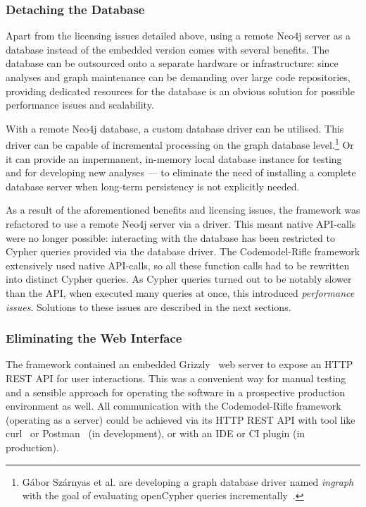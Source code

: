 \subsubsection{Detaching the Database}

Apart from the licensing issues detailed above, using a remote Neo4j server as a database instead of the embedded version comes with several benefits. The database can be outsourced onto a separate hardware or infrastructure: since analyses and graph maintenance can be demanding over large code repositories, providing dedicated resources for the database is an obvious solution for possible performance issues and scalability.

With a remote Neo4j database, a custom database driver can be utilised. This driver can be capable of incremental processing on the graph database level.\footnote{Gábor Szárnyas et al. are developing a graph database driver named \emph{ingraph} with the goal of evaluating openCypher queries incrementally~\cite{ingraph-github}.} Or it can provide an impermanent, in-memory local database instance for testing and for developing new analyses — to eliminate the need of installing a complete database server when long-term persistency is not explicitly needed.

As a result of the aforementioned benefits and licensing issues, the framework was refactored to use a remote Neo4j server via a driver. This meant native API-calls were no longer possible: interacting with the database has been restricted to Cypher queries provided via the database driver. The Codemodel-Rifle framework extensively used native API-calls, so all these function calls had to be rewritten into distinct Cypher queries. As Cypher queries turned out to be notably slower than the API, when executed many queries at once, this introduced \emph{performance issues}. Solutions to these issues are described in the next sections.


\subsubsection{Eliminating the Web Interface}

The framework contained an embedded Grizzly~\cite{grizzly-website} web server to expose an HTTP REST API for user interactions. This was a convenient way for manual testing and a sensible approach for operating the software in a prospective production environment as well. All communication with the Codemodel-Rifle framework (operating as a server) could be achieved via its HTTP REST API with tool like curl~\cite{curl-website} or Postman~\cite{postman-website} (in development), or with an IDE or CI plugin (in production).

